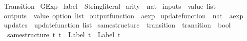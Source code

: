 %
\begin{isabellebody}%
%
%
\isadelimtheory
%
\endisadelimtheory
%
\isatagtheory
{}\isamarkupfalse%
\ Transition\isanewline
{}\ GExp\isanewline
{}%
\endisatagtheory
{\isafoldtheory}%
%
\isadelimtheory
\isanewline
%
\endisadelimtheory
\isanewline
{}\isamarkupfalse%
\ label\ {\isacharequal}\ String{\isachardot}literal\isanewline
{}\isamarkupfalse%
\ arity\ {\isacharequal}\ nat\isanewline
{}\isamarkupfalse%
\ inputs\ {\isacharequal}\ {\isachardoublequoteopen}value\ list{\isachardoublequoteclose}\isanewline
{}\isamarkupfalse%
\ outputs\ {\isacharequal}\ {\isachardoublequoteopen}value\ option\ list{\isachardoublequoteclose}\isanewline
{}\isamarkupfalse%
\ output{\isacharunderscore}function\ {\isacharequal}\ {\isachardoublequoteopen}aexp{\isachardoublequoteclose}\isanewline
\isanewline
{}\isamarkupfalse%
\ update{\isacharunderscore}function\ {\isacharequal}\ {\isachardoublequoteopen}{\isacharparenleft}nat\ {\isasymtimes}\ aexp{\isacharparenright}{\isachardoublequoteclose}\isanewline
{}\isamarkupfalse%
\ updates\ {\isacharequal}\ {\isachardoublequoteopen}update{\isacharunderscore}function\ list{\isachardoublequoteclose}%
\isamarkupfalse%
\ same{\isacharunderscore}structure\ {\isacharcolon}{\isacharcolon}\ {\isachardoublequoteopen}transition\ {\isasymRightarrow}\ transition\ {\isasymRightarrow}\ bool{\isachardoublequoteclose}\ \isanewline
\ \ {\isachardoublequoteopen}same{\isacharunderscore}structure\ t{}\ t{}\ {\isacharequal}\ {\isacharparenleft}Label\ t{}\ {\isacharequal}\ Label\ t{}\ {\isasymand}\isanewline

\end{isabellebody}
